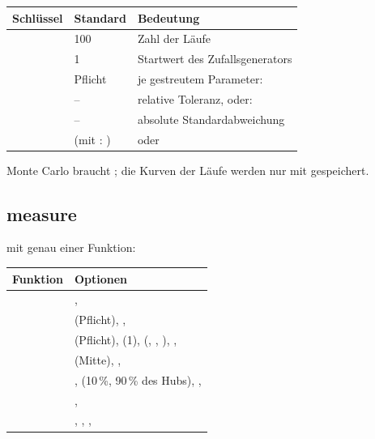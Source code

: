\begin{longtable}{@{}P{3.0cm}P{3.4cm}P{7.4cm}@{}}
  \toprule
  Schlüssel & Standard & Bedeutung \\
  \midrule
  \endhead
  \bottomrule
  \endfoot
   & 100 & Zahl der Läufe \\
   & 1 & Startwert des Zufallsgenerators \\
   & Pflicht &  je gestreutem Parameter: \\
  \quad{} & – & relative Toleranz, oder: \\
  \quad{} & – & absolute Standardabweichung \\
  \quad{} &  (mit : ) &  oder  \\
\end{longtable}

Monte Carlo braucht ; die Kurven der Läufe werden nur mit
 gespeichert.

\subsection*{measure}
\label{sec:ref-measure}

 mit genau
einer Funktion:

\begin{longtable}{@{}P{3.6cm}P{10.2cm}@{}}
  \toprule
  Funktion & Optionen \\
  \midrule
  \endhead
  \bottomrule
  \endfoot
   & ,  \\
   &  (Pflicht), ,  \\
   &  (Pflicht),  (1),  (, , ), ,  \\
   &  (Mitte), ,  \\
   & ,  (10\,\%, 90\,\% des Hubs), ,  \\
   & ,  \\
   & , , ,  \\
\end{longtable}

